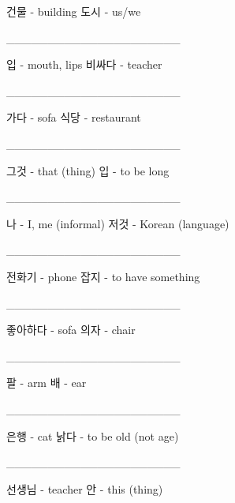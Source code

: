 \documentclass[addpoints, 30pt]{../exam}%
\begin{document}
\begin{questions}
\begin{choices}
\CorrectChoice%
건물 {-} building%
\choice%
도시 {-} us/we%
\end{choices}%
\question[1]%
\_\_\_\_\_\_\_\_\_\_\_\_\_\_\_\_\_\_\_\_\_%
\begin{choices}%
\CorrectChoice%
입 {-} mouth, lips%
\choice%
비싸다 {-} teacher%
\end{choices}%
\question[1]%
\_\_\_\_\_\_\_\_\_\_\_\_\_\_\_\_\_\_\_\_\_%
\begin{choices}%
\choice%
가다 {-} sofa%
\CorrectChoice%
식당 {-} restaurant%
\end{choices}%
\question[1]%
\_\_\_\_\_\_\_\_\_\_\_\_\_\_\_\_\_\_\_\_\_%
\begin{choices}%
\CorrectChoice%
그것 {-} that (thing)%
\choice%
입 {-} to be long%
\end{choices}%
\question[1]%
\_\_\_\_\_\_\_\_\_\_\_\_\_\_\_\_\_\_\_\_\_%
\begin{choices}%
\CorrectChoice%
나 {-} I, me (informal)%
\choice%
저것 {-} Korean (language)%
\end{choices}%
\question[1]%
\_\_\_\_\_\_\_\_\_\_\_\_\_\_\_\_\_\_\_\_\_%
\begin{choices}%
\CorrectChoice%
전화기 {-} phone%
\choice%
잡지 {-} to have something%
\end{choices}%
\question[1]%
\_\_\_\_\_\_\_\_\_\_\_\_\_\_\_\_\_\_\_\_\_%
\begin{choices}%
\choice%
좋아하다 {-} sofa%
\CorrectChoice%
의자 {-} chair%
\end{choices}%
\question[1]%
\_\_\_\_\_\_\_\_\_\_\_\_\_\_\_\_\_\_\_\_\_%
\begin{choices}%
\CorrectChoice%
팔 {-} arm%
\choice%
배 {-} ear%
\end{choices}%
\question[1]%
\_\_\_\_\_\_\_\_\_\_\_\_\_\_\_\_\_\_\_\_\_%
\begin{choices}%
\choice%
은행 {-} cat%
\CorrectChoice%
낡다 {-} to be old (not age)%
\end{choices}%
\question[1]%
\_\_\_\_\_\_\_\_\_\_\_\_\_\_\_\_\_\_\_\_\_%
\begin{choices}%
\CorrectChoice%
선생님 {-} teacher%
\choice%
안 {-} this (thing)%
\end{choices}%
\end{questions}%
\end{document}
